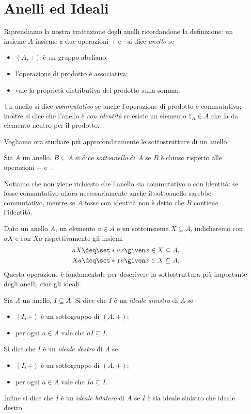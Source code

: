 \section{Anelli ed Ideali}

Riprendiamo la nostra trattazione degli anelli ricordandone la definizione: un insieme $A$ insieme a due operazioni $+$ e $\cdot$ si dice \emph{anello} se \begin{itemize}
    \item $(A, +)$ è un gruppo abeliano;
    \item l'operazione di prodotto è associativa;
    \item vale la proprietà distributiva del prodotto sulla somma.
\end{itemize} Un anello si dice \emph{commutativo} se anche l'operazione di prodotto è commutativa; inoltre si dice che l'anello è \emph{con identità} se esiste un elemento $1_A \in A$ che fa da elemento neutro per il prodotto.

Vogliamo ora studiare più approfonditamente le sottostrutture di un anello.
\begin{definition}
    [Sottoanello] Sia $A$ un anello. $B \subseteq A$ si dice \emph{sottoanello} di $A$ se $B$ è chiuso rispetto alle operazioni $+$ e $\cdot$.
\end{definition}

Notiamo che non viene richiesto che l'anello sia commutativo o con identità: se fosse commutativo allora necessariamente anche il sottoanello sarebbe commutativo, mentre se $A$ fosse con identità non è detto che $B$ contiene l'identità.

Dato un anello $A$, un elemento $a \in A$ e un sottoinsieme $X \subseteq A$, indicheremo con $aX$ e con $Xa$ rispettivamente gli insiemi \begin{align*}
    &aX \deq \set*{ax \given x \in X} \subseteq A,\\
    &Xa \deq \set*{xa \given x \in X} \subseteq A.
\end{align*} Questa operazione è fondamentale per descrivere la sottostruttura più importante degli anelli, cioè gli ideali.

\begin{definition}
    [Ideale] Sia $A$ un anello, $I \subseteq A$. Si dice che $I$ è un \emph{ideale sinistro} di $A$ se \begin{itemize}
        \item $(I, +)$ è un sottogruppo di $(A, +)$;
        \item per ogni $a \in A$ vale che $aI \subseteq I$.
    \end{itemize}
    Si dice che $I$ è un \emph{ideale destro} di $A$ se \begin{itemize}
        \item $(I, +)$ è un sottogruppo di $(A, +)$;
        \item per ogni $a \in A$ vale che $Ia \subseteq I$.
    \end{itemize}
    Infine si dice che $I$ è un \emph{ideale bilatero} di $A$ se $I$ è sia ideale sinistro che ideale destro.
\end{definition}


